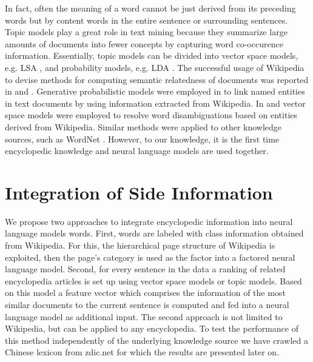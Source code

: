 \documentclass[a4paper]{article}
\begin{document}
In fact, often the meaning of a word cannot be just derived from its preceding words but by content words in the entire sentence or surrounding sentences. 
Topic models play a great role in text mining because they summarize large amounts of documents into fewer concepts by capturing word co-occurence information. Essentially, topic models can be divided into vector space models, e.g. LSA \cite{deerwester1990indexing}, and probability models, e.g. LDA \cite{blei2003latent}. 
The successful usage of Wikipedia to devise methods for computing semantic relatedness of documents was reported in \cite{gabrilovich2007computing} and \cite{strube2006wikirelate}.
Generative probabilistic models were employed in \cite{han2012entity} to link named entities in text documents by using information extracted from Wikipedia. 
In \cite{cucerzan2007large} and \cite{bunescu2006using} vector space models were employed to resolve word disambiguations based on entities derived from Wikipedia.
Similar methods were applied to other knowledge sources, such as WordNet \cite{hearst1992automatic}.
However, to our knowledge, it is the first time encyclopedic knowledge and neural language models are used together.

\section{Integration of Side Information}
We propose two approaches to integrate encyclopedic information into neural language models words.
First, words are labeled with class information obtained from Wikipedia. For this, the hierarchical page structure of Wikipedia is exploited, then the page's category is used as the factor into a factored neural language model.
Second, for every sentence in the data a ranking of related encyclopedia articles is set up using vector space models or topic models. Based on this model a feature vector which comprises the information of the most similar documents to the current sentence is computed  and fed into a neural language model as additional input. The second approach is not limited to Wikipedia, but can be applied to any encyclopedia. To test the performance of this method independently of the underlying knowledge source we have crawled a Chinese lexicon from zdic.net \cite{zdic} for which the results are presented later on. 
\end{document}
